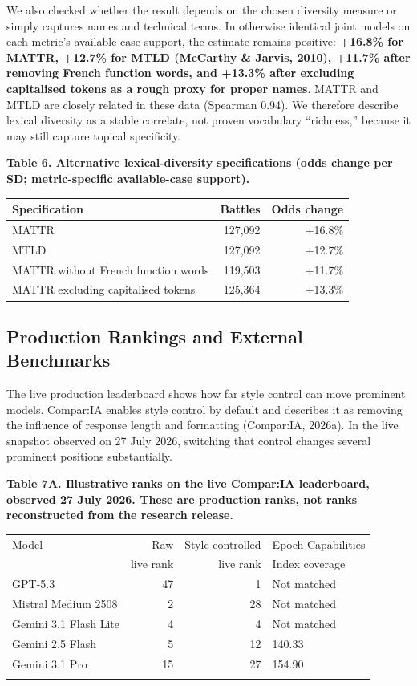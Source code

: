 \documentclass[
]{article}
\newcounter{none} %
\begin{document}
We also checked whether the result depends on the chosen diversity
measure or simply captures names and technical terms. In otherwise
identical joint models on each metric's available-case support, the
estimate remains positive: \textbf{+16.8\% for MATTR, +12.7\% for MTLD
(McCarthy \& Jarvis, 2010), +11.7\% after removing French function
words, and +13.3\% after excluding capitalised tokens as a rough proxy
for proper names}. MATTR
and MTLD are closely related in these data (Spearman 0.94). We therefore
describe lexical diversity as a stable correlate, not proven vocabulary
``richness,'' because it may still capture topical specificity.

\textbf{Table 6. Alternative lexical-diversity specifications (odds
change per SD; metric-specific available-case support).}

{\def\LTcaptype{none}
\begin{longtable}[]{@{}lrr@{}}
\toprule\noalign{}
Specification & Battles & Odds change \\
\midrule\noalign{}
\endhead
\bottomrule\noalign{}
\endlastfoot
MATTR & 127,092 & +16.8\% \\
MTLD & 127,092 & +12.7\% \\
MATTR without French function words & 119,503 & +11.7\% \\
MATTR excluding capitalised tokens & 125,364 & +13.3\% \\
\end{longtable}
}

\subsection{Production Rankings and External
Benchmarks}\label{production-rankings-and-external-benchmarks}

The live production leaderboard shows how far style control can move
prominent models. Compar:IA enables style control by default
and describes it as removing the influence of response length and
formatting (Compar:IA, 2026a). In the live snapshot observed on 27 July
2026, switching that control changes several prominent positions
substantially.

\begin{table}[htbp]
\textbf{Table 7A. Illustrative ranks on the live Compar:IA leaderboard,
observed 27 July 2026. These are production ranks, not ranks
reconstructed from the research release.}

\medskip
\centering
\begin{tabular}{@{}lrrl@{}}
\toprule\noalign{}
Model & Raw & Style-controlled & Epoch Capabilities \\
 & live rank & live rank & Index coverage \\
\midrule\noalign{}
GPT-5.3 & 47 & 1 & Not matched \\
Mistral Medium 2508 & 2 & 28 & Not matched \\
Gemini 3.1 Flash Lite & 4 & 4 & Not matched \\
Gemini 2.5 Flash & 5 & 12 & 140.33 \\
Gemini 3.1 Pro & 15 & 27 & 154.90 \\
\bottomrule\noalign{}
\end{tabular}
\end{table}
\end{document}
